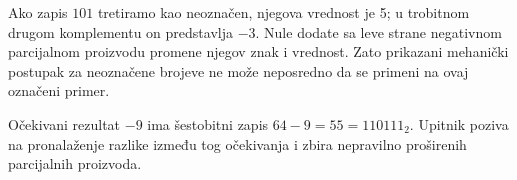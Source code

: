 Ako zapis $101$ tretiramo kao neoznačen, njegova vrednost je 5; u trobitnom drugom komplementu on predstavlja $-3$. Nule dodate sa leve strane negativnom parcijalnom proizvodu promene njegov znak i vrednost. Zato prikazani mehanički postupak za neoznačene brojeve ne može neposredno da se primeni na ovaj označeni primer.

Očekivani rezultat $-9$ ima šestobitni zapis $64-9=55=110111_2$. Upitnik poziva na pronalaženje razlike između tog očekivanja i zbira nepravilno proširenih parcijalnih proizvoda.
